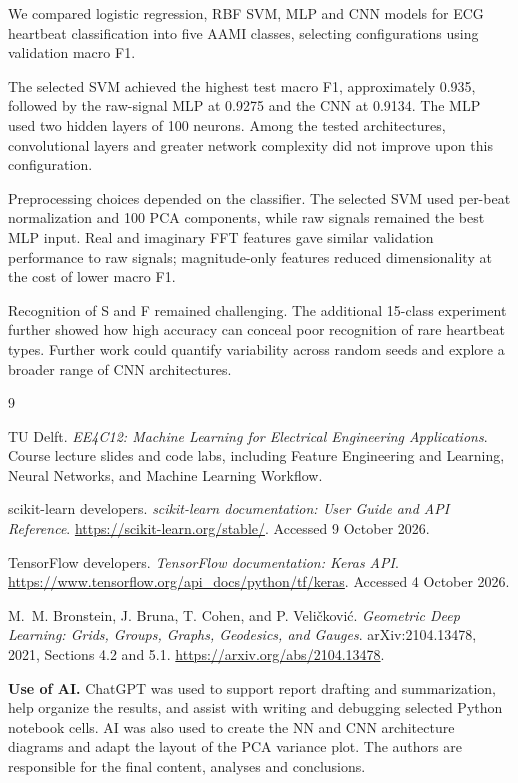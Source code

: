 \documentclass[11pt,oneside,a4paper]{article}
\begin{document}
    We compared logistic regression, RBF SVM, MLP and CNN models
    for ECG heartbeat classification into five AAMI classes,
    selecting configurations using validation macro F1.

    The selected SVM achieved the highest test macro F1,
    approximately 0.935, followed by the raw-signal MLP at 0.9275
    and the CNN at 0.9134. The MLP used two hidden layers of
    100 neurons. Among the tested architectures, convolutional
    layers and greater network complexity did not improve upon
    this configuration.

    Preprocessing choices depended on the classifier. The
    selected SVM used per-beat normalization and 100 PCA
    components, while raw signals remained the best MLP input.
    Real and imaginary FFT features gave similar validation
    performance to raw signals; magnitude-only features reduced
    dimensionality at the cost of lower macro F1.

    Recognition of S and F remained challenging. The additional
    15-class experiment further showed how high accuracy can
    conceal poor recognition of rare heartbeat types.
    Further work could quantify variability across random seeds
    and explore a broader range of CNN architectures.

    \begin{thebibliography}{9}
        \small
        \raggedright

        TU Delft.
        \emph{EE4C12: Machine Learning for Electrical Engineering
        Applications}. Course lecture slides and code labs,
        including Feature Engineering and Learning, Neural Networks,
        and Machine Learning Workflow.

        scikit-learn developers.
        \emph{scikit-learn documentation: User Guide and API Reference}.
        \url{https://scikit-learn.org/stable/}.
        Accessed 9 October 2026.

        TensorFlow developers.
        \emph{TensorFlow documentation: Keras API}.
        \url{https://www.tensorflow.org/api_docs/python/tf/keras}.
        Accessed 4 October 2026.

        M.~M. Bronstein, J. Bruna, T. Cohen, and P. Veli\v{c}kovi\'{c}.
        \emph{Geometric Deep Learning: Grids, Groups, Graphs,
        Geodesics, and Gauges}. arXiv:2104.13478, 2021,
        Sections 4.2 and 5.1.
        \url{https://arxiv.org/abs/2104.13478}.
    \end{thebibliography}

    {\small
    \noindent\textbf{Use of AI.}
    ChatGPT was used to support report
    drafting and summarization, help organize the results, and assist with writing and debugging
    selected Python notebook cells. AI was also used to create the NN and CNN
    architecture diagrams and adapt the layout of the PCA variance plot.
    The authors are responsible for the final content, analyses
    and conclusions.\par}
\end{document}
